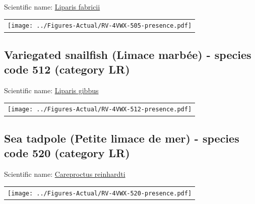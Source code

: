 \documentclass[12pt]{article}\usepackage[]{graphicx}\usepackage[]{color}
\begin{document}
Scientific name: \href{http://www.marinespecies.org/aphia.php?p=taxdetails\&id=127218}{Liparis fabricii} \newline
\begin{minipage}{1.0\textwidth}
 \begin{tabular}{c}
\texttt{[image: ../Figures-Actual/RV-4VWX-505-presence.pdf]} \\ 
\end{tabular} 
\end{minipage}
\clearpage

\renewcommand\thefigure{\thesubsection\Alph{figure}}

\setcounter{figure}{0}

\hypertarget{sec:512}{%
\subsection{Variegated snailfish (Limace marbée) - species code 512 (category LR)}\label{sec:512}}

  


Scientific name: \href{http://www.marinespecies.org/aphia.php?p=taxdetails\&id=159526}{Liparis gibbus} \newline
\begin{minipage}{1.0\textwidth}
 \begin{tabular}{c}
\texttt{[image: ../Figures-Actual/RV-4VWX-512-presence.pdf]} \\ 
\end{tabular} 
\end{minipage}
\clearpage

\renewcommand\thefigure{\thesubsection\Alph{figure}}

\setcounter{figure}{0}

\hypertarget{sec:520}{%
\subsection{Sea tadpole (Petite limace de mer) - species code 520 (category LR)}\label{sec:520}}

  


Scientific name: \href{http://www.marinespecies.org/aphia.php?p=taxdetails\&id=127212}{Careproctus reinhardti} \newline
\begin{minipage}{1.0\textwidth}
 \begin{tabular}{c}
\texttt{[image: ../Figures-Actual/RV-4VWX-520-presence.pdf]} \\ 
\end{tabular} 
\end{minipage}
\clearpage
\end{document}
